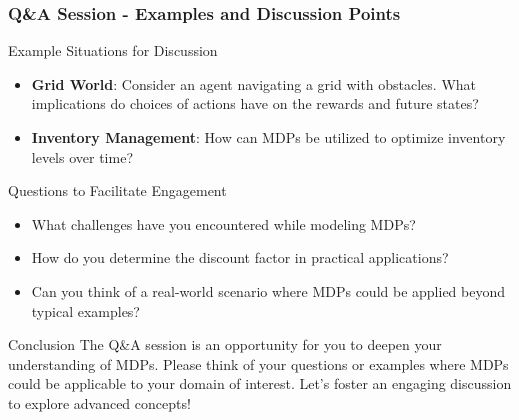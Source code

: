 \documentclass[aspectratio=169]{beamer}
\begin{document}
\begin{frame}[fragile]
  \frametitle{Q\&A Session - Examples and Discussion Points}
  
  \begin{block}{Example Situations for Discussion}
    \begin{itemize}
      \item \textbf{Grid World}: Consider an agent navigating a grid with obstacles. What implications do choices of actions have on the rewards and future states?
      \item \textbf{Inventory Management}: How can MDPs be utilized to optimize inventory levels over time?
    \end{itemize}
  \end{block}

  \begin{block}{Questions to Facilitate Engagement}
    \begin{itemize}
      \item What challenges have you encountered while modeling MDPs?
      \item How do you determine the discount factor in practical applications?
      \item Can you think of a real-world scenario where MDPs could be applied beyond typical examples?
    \end{itemize}
  \end{block}
  
  \begin{block}{Conclusion}
    The Q\&A session is an opportunity for you to deepen your understanding of MDPs. Please think of your questions or examples where MDPs could be applicable to your domain of interest. Let's foster an engaging discussion to explore advanced concepts!
  \end{block}
\end{frame}
\end{document}
